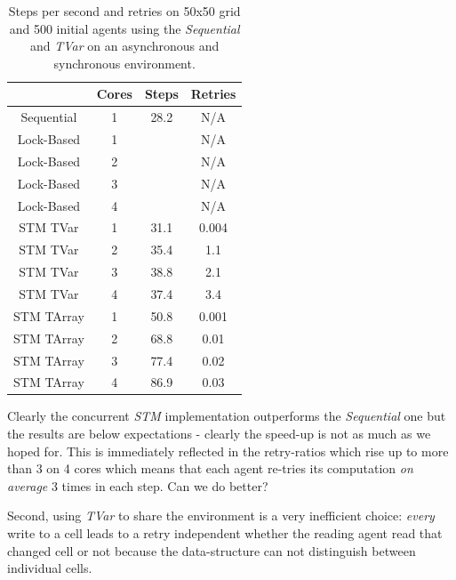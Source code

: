 \begin{table}
	\centering
  	\begin{tabular}{ c || c | c | c }
                   & Cores & Steps & Retries  \\ \hline \hline 
    	Sequential & 1     & 28.2  & N/A      \\ \hline \hline   

    	Lock-Based & 1     &  & N/A    \\ \hline
    	Lock-Based & 2     &  & N/A    \\ \hline
    	Lock-Based & 3     &  & N/A    \\ \hline
    	Lock-Based & 4     &  & N/A    \\ \hline \hline   
   		
   		STM TVar   & 1     & 31.1  & 0.004    \\ \hline
   		STM TVar   & 2     & 35.4  & 1.1 	  \\ \hline
   		STM TVar   & 3     & 38.8  & 2.1 	  \\ \hline
   		STM TVar   & 4     & 37.4  & 3.4	  \\ \hline \hline   
   		
   		STM TArray & 1     & 50.8  & 0.001    \\ \hline
   		STM TArray & 2     & 68.8  & 0.01	  \\ \hline
   		STM TArray & 3     & 77.4  & 0.02	  \\ \hline
   		STM TArray & 4     & 86.9  & 0.03	  \\ \hline \hline   
   	\end{tabular}
  	
  	\caption{Steps per second and retries on 50x50 grid and 500 initial agents using the \textit{Sequential} and \textit{TVar} on an asynchronous and synchronous environment.}
	\label{tab:constant_agents_results}
\end{table}

Clearly the concurrent \textit{STM} implementation outperforms the \textit{Sequential} one but the results are below expectations - clearly the speed-up is not as much as we hoped for. This is immediately reflected in the retry-ratios which rise up to more than 3 on 4 cores which means that each agent re-tries its computation \textit{on average} 3 times in each step. Can we do better?

Second, using \textit{TVar} to share the environment is a very inefficient choice: \textit{every} write to a cell leads to a retry independent whether the reading agent read that changed cell or not because the data-structure can not distinguish between individual cells.

